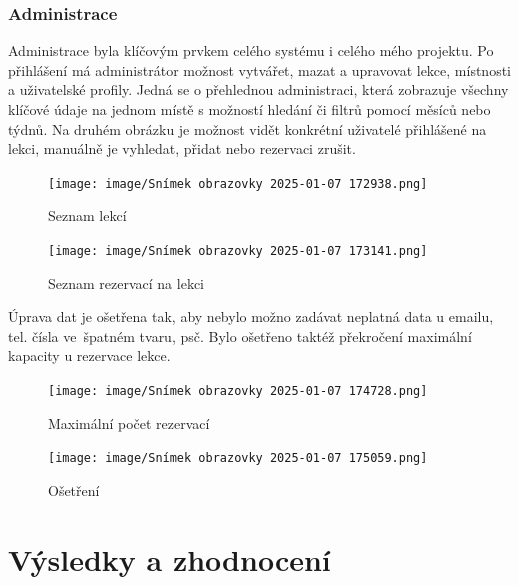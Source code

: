 \documentclass[12pt, a4paper,
openright
]{report}
\begin{document}
    \subsection{Administrace}
    Administrace byla klíčovým prvkem celého systému i celého mého projektu.
    Po přihlášení má administrátor možnost vytvářet, mazat a upravovat lekce, místnosti a uživatelské profily.
    Jedná se o přehlednou administraci, která zobrazuje všechny klíčové údaje na jednom místě s možností hledání či filtrů pomocí měsíců nebo týdnů. Na druhém obrázku je možnost vidět konkrétní uživatelé přihlášené na lekci, manuálně je vyhledat, přidat nebo rezervaci zrušit.
    
    \begin{figure}[h]
    \centering
    \begin{minipage}{0.45\textwidth}
        \centering
        \texttt{[image: image/Snímek obrazovky 2025-01-07 172938.png]}
        \caption{Seznam lekcí}
        \label{fig:image1}
    \end{minipage}
    \hfill
    \begin{minipage}{0.45\textwidth}
        \centering
        \texttt{[image: image/Snímek obrazovky 2025-01-07 173141.png]}
        \caption{Seznam rezervací na lekci}
        \label{fig:image2}
    \end{minipage}
    \end{figure}
    \clearpage
        Úprava dat je ošetřena tak, aby nebylo možno zadávat neplatná data u emailu, tel. čísla ve~špatném tvaru, psč. Bylo ošetřeno taktéž překročení maximální kapacity u rezervace lekce.
        \begin{figure}[h!]
            \centering
            \texttt{[image: image/Snímek obrazovky 2025-01-07 174728.png]}
            \caption{Maximální počet rezervací}
            \label{fig:enter-label}
        \end{figure}
\begin{figure}[h!]
    \centering
    \texttt{[image: image/Snímek obrazovky 2025-01-07 175059.png]}
    \caption{Ošetření}
    \label{fig:enter-label}
\end{figure}



\chapter{Výsledky a zhodnocení}
\end{document}
